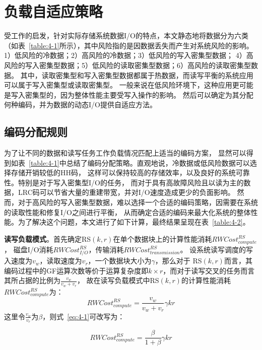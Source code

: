 \section{负载自适应策略}
\label{Section:4.3}

受\citet{qiu2020ec}工作的启发，针对实际存储系统数据I/O的特点，本文静态地将数据分为六类（如表~\ref{table:4-1}所示），其中风险指的是因数据丢失而产生对系统风险的影响。
1）低风险的冷数据；2）高风险的冷数据；3）低风险的写入密集型数据；
4）高风险的写入密集型数据；5）低风险的读取密集型数据；6）高风险的读取密集型数据。
其中，读取密集型和写入密集型数据都属于热数据，而读写平衡的系统应用可以属于写入密集型或读取密集型。
一般来说在低风险环境下，这种应用更可能是写入密集型的，因为整体性能主要受写入操作的影响。
然后可以确定为其分配何种编码，并为数据的动态I/O提供自适应方法。



\subsection{编码分配规则}
\label{subsection:4.1}
为了让不同的数据和读写任务工作负载情况匹配上适当的编码方案，
显然可以得到如表~\ref{table:4-1}中总结了编码分配策略。直观地说，冷数据或低风险数据可以选择存储开销较低的HH码，
这样可以保持较高的存储效率，以及良好的系统可靠性。特别是对于写入密集型I/O的任务，
而对于具有高故障风险且以读为主的数据，LRC码可以节省大量的重建带宽，并对I/O速度造成更少的负面影响。
然而，对于高风险的写入密集型数据，难以选择一个合适的编码策略，因需要在系统的读取性能和修复I/O之间进行平衡，
从而确定合适的编码来最大化系统的整体性能。为了解决这个问题，本文进行了如下计算，最终结果呈现在表~\ref{table:4-2}。

\textbf{读写负载模式}。首先确定RS$(k,r)$在单个数据块上的计算性能消耗$RWCost_{compute}^{RS}$，
磁盘I/O消耗$RWCost_{I/O}^{RS}$，传输消耗$RWCost_{transmission}^{RS}$。
设系统读写调度的写入速度为$v_w$，读取速度为$v_r$，一个数据块大小为$\gamma$，那么对于
RS$(k,r)$而言，其编码过程中的GF运算次数等价于运算复杂度即$k \times r$，而对于读写交叉的任务而言其所占据的比例为$\frac{v_w}{v_w+v_r}$，
故在读写负载模式中RS$(k,r)$的计算性能消耗$RWCost_{compute}^{RS}$为：
\begin{equation}
	\label{eq:4-1}
	RWCost_{compute}^{RS} = \frac{v_w}{v_w+v_r} \gamma kr
\end{equation}
这里令$\frac{v_w}{v_r}$为$\beta$，则式~\ref{eq:4-1}可改写为：

\begin{equation}
	\label{eq:4-2}
	RWCost_{compute}^{RS} = \frac{\beta}{1+\beta} \gamma kr
\end{equation}

